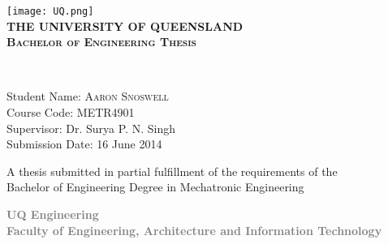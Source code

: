 \begin{titlepage}

\begin{center}

\texttt{[image: UQ.png]}\\[1.5cm]    

\textsc{\Large \bfseries {\Huge T}HE {\Huge U}NIVERSITY OF {\Huge Q}UEENSLAND}\\[2cm]

\textsc{\large \bfseries Bachelor of Engineering Thesis}\\[1.5cm]


\newlength{\mylength}

\setlength{\fboxsep}{1pt}
\setlength{\mylength}{\linewidth}

\addtolength{\mylength}{-1.5\fboxsep}
\addtolength{\mylength}{-1.5\fboxrule}


		
\textsc{}\\[1.5cm]

\begin{minipage}{0.8\textwidth}
\begin{flushleft} \large
Student Name: \textsc{Aaron Snoswell}\\[0.1cm]
Course Code: METR4901\\[0.1cm]
Supervisor: Dr. Surya P. N. Singh\\[0.1cm]
Submission Date: 16 June 2014\\[0.1cm]
\end{flushleft}
\end{minipage}




\vfill


{\small A thesis submitted in partial fulfillment of the requirements of the\\
Bachelor of Engineering Degree in Mechatronic Engineering\\[1.5cm]}

\textcolor{Gray}
{
{\small  \bfseries UQ Engineering\\[0.5cm]
Faculty of Engineering, Architecture and Information Technology}
}


\end{center}

\end{titlepage}